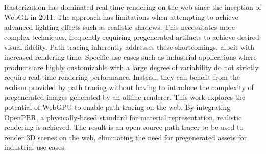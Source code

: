 
Rasterization has dominated real-time rendering on the web since the inception of WebGL in 2011. The approach has limitations when attempting to achieve advanced lighting effects such as realistic shadows. This necessitates more complex techniques, frequently requiring pregenerated artifacts to achieve desired visual fidelity. Path tracing inherently addresses these shortcomings, albeit with increased rendering time. Specific use cases such as industrial applications where products are highly customizable with a large degree of variability do not strictly require real-time rendering performance. Instead, they can benefit from the realism provided by path tracing without having to introduce the complexity of pregenerated images generated by an offline renderer. This work explores the potential of WebGPU to enable path tracing on the web. By integrating OpenPBR, a physically-based standard for material representation, realistic rendering is achieved. The result is an open-source path tracer to be used to render 3D scenes on the web, eliminating the need for pregenerated assets for industrial use cases.
